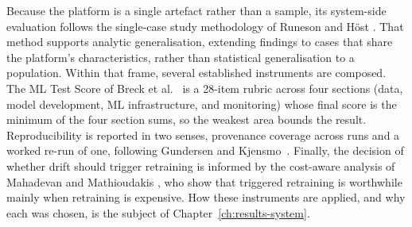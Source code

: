 Because the platform is a single artefact rather than a sample, its system-side
evaluation follows the single-case study methodology of Runeson and H\"ost
\cite{runeson2009casestudy}. That method supports analytic generalisation,
extending findings to cases that share the platform's characteristics, rather
than statistical generalisation to a population. Within that frame, several
established instruments are composed. The ML Test Score of Breck et al.\
\cite{breck2017mltestscore} is a 28-item rubric across four sections (data,
model development, ML infrastructure, and monitoring) whose final score is the
minimum of the four section sums, so the weakest area bounds the result.
Reproducibility is reported in two senses, provenance coverage across runs and a
worked re-run of one, following Gundersen and
Kjensmo~\cite{gundersen2018reproducibility}. Finally, the decision of whether drift should
trigger retraining is informed by the cost-aware analysis of Mahadevan and
Mathioudakis \cite{mahadevan2024costaware}, who show that triggered retraining
is worthwhile mainly when retraining is expensive. How these instruments are
applied, and why each was chosen, is the subject of
Chapter~\ref{ch:results-system}.
